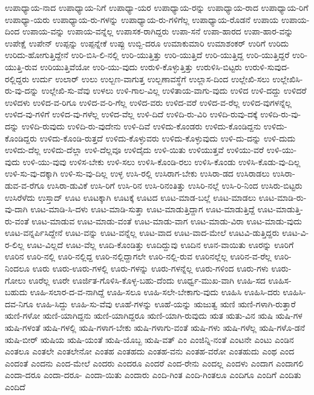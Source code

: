 {ಉಪಾಧ್ಯಾಯ-ನಾದ
ಉಪಾಧ್ಯಾಯ-ನಿಗೆ
ಉಪಾಧ್ಯಾ-ಯರ
ಉಪಾಧ್ಯಾಯ-ರನ್ನು
ಉಪಾಧ್ಯಾಯ-ರಾದ
ಉಪಾಧ್ಯಾಯ-ರಿಗೆ
ಉಪಾಧ್ಯಾ-ಯರು
ಉಪಾಧ್ಯಾಯ-ರು-ಗಳನ್ನು
ಉಪಾಧ್ಯಾಯ-ರು-ಗಳಿಗೆಲ್ಲ
ಉಪಾಧ್ಯಾಯ-ರೊಡನೆ
ಉಪಾಯ
ಉಪಾಯ-ದಿಂದ
ಉಪಾಯ-ವನ್ನು
ಉಪಾಯ-ವನ್ನೆಲ್ಲ
ಉಪಾಸಕ-ರಾಗಿದ್ದರು
ಉಪಾ-ಸನೆ
ಉಪಾ-ಹಾರದ
ಉಪಾ-ಹಾರ-ವನ್ನು
ಉಪೇಕ್ಷೆ
ಉಪೇನ್
ಉಪ್ಪನ್ನು
ಉಪ್ಪನ್ನೇಕೆ
ಉಪ್ಪು
ಉಬ್ಬಿ-ದರೂ
ಉಮಾಕುಮಾರಿ
ಉಮಾಶಂಕರ್
ಉರಿಗೆ
ಉರಿದು
ಉರಿದು-ಹೋಗುತ್ತಿದ್ದೇನೆ
ಉರಿ-ಬಿಸಿ-ಲಿ-ನಲ್ಲಿ
ಉರಿ-ಯುತ್ತಿತ್ತು
ಉರಿ-ಯುತ್ತಿದೆ
ಉರಿ-ಯುತ್ತಿದ್ದ
ಉರಿ-ಯುತ್ತಿದ್ದರೆ
ಉರಿ-ಯುತ್ತಿ-ರುವ
ಉರಿಯುತ್ತಿವೆಯೋ
ಉರಿ-ಯು-ವುದು
ಉರುಳಿ-ಕೊಳ್ಳುತ್ತಿತ್ತು
ಉರುಳಿಸಿ-ಬಿಟ್ಟರು
ಉರುಳಿ-ಸುವುದ-ರಲ್ಲಿದ್ದರು
ಉರ್ದು
ಉಲಾರ್
ಉಲು
ಉಲ್ಬಣ-ವಾಗುತ್ತ
ಉಲ್ಬಣಾವಸ್ಥೆಗೆ
ಉಲ್ಲಾಸ-ದಿಂದ
ಉಲ್ಲೇಖಿ-ಸಲು
ಉಲ್ಲೇಖಿಸಿ-ರು-ವು-ದನ್ನು
ಉಲ್ಲೇಖಿ-ಸು-ವೆವು
ಉಳಲು
ಉಳಿ-ಗಾಲ-ವಿಲ್ಲ
ಉಳಿತಾಯ-ವಾಗು-ವುದು
ಉಳಿದ
ಉಳಿ-ದದ್ದು
ಉಳಿದರೆ
ಉಳಿದಳು
ಉಳಿದ-ವ-ರಿಗೂ
ಉಳಿದ-ವ-ರಿ-ಗೆಲ್ಲ
ಉಳಿದ-ವರು
ಉಳಿದ-ವರೆ
ಉಳಿದ-ವ-ರೆಲ್ಲ
ಉಳಿದ-ವುಗಳನ್ನೆಲ್ಲ
ಉಳಿದ-ವು-ಗಳಿಗೆ
ಉಳಿದ-ವು-ಗಳೆಲ್ಲ
ಉಳಿದ-ವೆಲ್ಲ
ಉಳಿ-ದಿದೆ
ಉಳಿದಿ-ರು-ವಿರಿ
ಉಳಿದಿ-ರುವು-ದಕ್ಕೆ
ಉಳಿದಿ-ರು-ವು-ದನ್ನು
ಉಳಿದಿ-ರುವುದು
ಉಳಿದಿ-ರು-ವುದೇನು
ಉಳಿ-ದಿವೆ
ಉಳಿದು-ಕೊಂಡರು
ಉಳಿದು-ಕೊಂಡಿದ್ದನು
ಉಳಿದು-ಕೊಂಡಿದ್ದರು
ಉಳಿದು-ಕೊಂಡಿ-ರುತ್ತದೆ
ಉಳಿದು-ಕೊಳ್ಳುವರು
ಉಳಿದು-ಕೊಳ್ಳುವುದು
ಉಳಿ-ದು-ದನ್ನು
ಉಳಿ-ದುದು
ಉಳಿದು-ದೆಲ್ಲ
ಉಳಿದು-ದೆಲ್ಲಾ
ಉಳಿ-ದೆಲ್ಲವೂ
ಉಳಿದೈದು
ಉಳಿ-ಯಿತು
ಉಳಿಯುತ್ತವೆ
ಉಳಿಯು-ವರೆ
ಉಳಿ-ಯು-ವುದು
ಉಳಿ-ಯು-ವುವು
ಉಳಿಸ-ಬೇಕು
ಉಳಿ-ಸಲು
ಉಳಿಸಿ-ಕೊಂಡಿ-ರಲು
ಉಳಿಸಿ-ಕೊಂಡು
ಉಳಿಸಿ-ಕೊಡು-ವು-ದಿಲ್ಲ
ಉಳಿ-ಸು-ವು-ದಕ್ಕಾಗಿ
ಉಳಿ-ಸು-ವು-ದಿಲ್ಲ
ಉಳ್ಳ
ಉಸಿ-ರಲ್ಲಿ
ಉಸಿರಾಗ-ಬೇಕು
ಉಸಿರಾ-ಡದ
ಉಸಿರಾಡಲು
ಉಸಿರಾ-ಡುವ-ವ-ರೆಗೂ
ಉಸಿರಾ-ಡುವಿಕೆ
ಉಸಿ-ರಿಗೆ
ಉಸಿ-ರಿನ
ಉಸಿ-ರಿನಂತಿತ್ತು
ಉಸಿರಿ-ನಲ್ಲೆ
ಉಸಿ-ರಿ-ನಿಂದ
ಉಸಿರು-ಬಿಟ್ಟರು
ಉಸಿರೆಳೆದು
ಉಸ್ತಾದ್
ಊಟ
ಊಟಕ್ಕಾಗಿ
ಊಟಕ್ಕೆ
ಊಟದ
ಊಟ-ಮಾಡ-ಬಲ್ಲೆ
ಊಟ-ಮಾಡಲು
ಊಟ-ಮಾಡಿ-ರು-ವು-ದಾಗಿ
ಊಟ-ಮಾಡಿ-ಸಿ-ದಳು
ಊಟ-ಮಾಡಿ-ಸುತ್ತಾ
ಊಟ-ಮಾಡುತ್ತಿದ್ದಾಗ
ಊಟ-ಮಾಡುತ್ತಿದ್ದೆ
ಊಟ-ಮಾಡುತ್ತಿ-ರು-ವಂತೆ
ಊಟ-ಮಾಡುವ
ಊಟ-ಮಾಡು-ವಂತೆ
ಊಟ-ಮಾಡು-ವಾಗ
ಊಟ-ಮಾಡು-ವಿರಾ
ಊಟ-ಮಾಡು-ವುದು
ಊಟ-ವನ್ನರ್ಪಿಸಿದ್ದೇನೆ
ಊಟ-ವನ್ನು
ಊಟ-ವನ್ನೆಲ್ಲ
ಊಟ-ವಾದ
ಊಟ-ವಾದ-ಮೇಲೆ
ಊಟವಿ-ಡುತ್ತಿದ್ದರು
ಊಟ-ವಿ-ರ-ಲಿಲ್ಲ
ಊಟ-ವಿಲ್ಲದೆ
ಊಟ-ವೆಲ್ಲ
ಊದಿ-ಕೊಂಡಿತ್ತು
ಊದಿದ್ದುವು
ಊದಿನ
ಊನ-ವಾಯಿತು
ಊರನ್ನು
ಊರಿಗೆ
ಊರಿನ
ಊರಿ-ನಲ್ಲಿ
ಊರಿ-ನಲ್ಲಿದ್ದ
ಊರಿ-ನಲ್ಲಿದ್ದಾಗಲೇ
ಊರಿ-ನಲ್ಲಿ-ರುವ
ಊರಿನಲ್ಲೆಲ್ಲ
ಊರಿನ-ವ-ರೆಲ್ಲ
ಊರಿ-ನಿಂದಲೂ
ಊರು
ಊರು-ಊರು-ಗಳಲ್ಲಿ
ಊರು-ಗಳನ್ನು
ಊರು-ಗಳನ್ನೆಲ್ಲ
ಊರು-ಗಳಿಂದ
ಊರು-ಗಳು
ಊರು-ಗೋಲು
ಊರೆಲ್ಲ
ಊರೇ
ಊರ್ಜಿತ-ಗೊಳಿಸಿ-ಕೊಳ್ಳ-ಬಹು-ದೆಂದು
ಊರ್ಧ್ವ-ಮುಖ-ವಾಗಿ
ಊಹಿ-ಸದ
ಊಹಿಸ-ಬಹುದು
ಊಹಿ-ಸಲಾರ-ದ-ವ-ನಾಗಿದ್ದೆ
ಊಹಿ-ಸಲೂ
ಊಹಿ-ಸಲೇ-ಬೇಕಾಗು-ವುದು
ಊಹಿಸಿ
ಊಹಿಸಿ-ದರು
ಊಹಿಸಿ-ದವ-ನಿಗೂ
ಊಹಿ-ಸಿದ್ದು
ಊಹಿ-ಸು-ವೆವು
ಊಹೆ-ಗಳನ್ನು
ಊಹೆ-ಯನ್ನು
ಋಜುತ್ವ
ಋಣಿ
ಋಣಿ-ಗಳಾಗಿ-ರುತ್ತಾರೆ
ಋಣಿ-ಗಳೋ
ಋಣಿ-ಯಾಗಿದ್ದನು
ಋಣಿ-ಯಾಗಿದ್ದರೂ
ಋಣಿ-ಯಾಗಿ-ರುವುದು
ಋತ
ಋತು-ವಿನ
ಋಷಿ
ಋಷಿ-ಗಳ
ಋಷಿ-ಗಳಂತೆ
ಋಷಿ-ಗಳಲ್ಲಿ
ಋಷಿ-ಗಳಾಗ-ಬೇಕು
ಋಷಿ-ಗಳಾಗು-ವಂತೆ
ಋಷಿ-ಗಳು
ಋಷಿ-ಗಳೆಲ್ಲ
ಋಷಿ-ಗಳೊ-ಡನೆ
ಋಷಿ-ಬೀರ್
ಋಷಿಯ
ಋಷಿ-ಯಂತೆ
ಋಷಿ-ಯೊಬ್ಬ
ಋಷಿ-ವತ್
ಎಂ
ಎಂಜಿನ್ನಿ-ನಂತೆ
ಎಂಟನೇ
ಎಂಟು
ಎಂಡಿನ
ಎಂತಲೂ
ಎಂತಲೇ
ಎಂತಲೇನೋ
ಎಂತಹ
ಎಂತಹದು
ಎಂತಹ-ವನು
ಎಂತಹ-ವರೋ
ಎಂತಹುದು
ಎಂಥ
ಎಂದ
ಎಂದಂತೆ
ಎಂದನು
ಎಂದ-ಮೇಲೆ
ಎಂದರು
ಎಂದರೂ
ಎಂದರೆ
ಎಂದ-ರೇನು
ಎಂದಲ್ಲ
ಎಂದಳು
ಎಂದಾಗ
ಎಂದಾಗಲಿ
ಎಂದಾ-ದರೂ
ಎಂದಾ-ದರೂ-
ಎಂದಾ-ಯಿತು
ಎಂದಾರು
ಎಂದಿ-ಗಿಂತ
ಎಂದಿ-ಗಿಂತಲೂ
ಎಂದಿಗೂ
ಎಂದಿಗೆ
ಎಂದಿತು
ಎಂದಿದೆ
}
